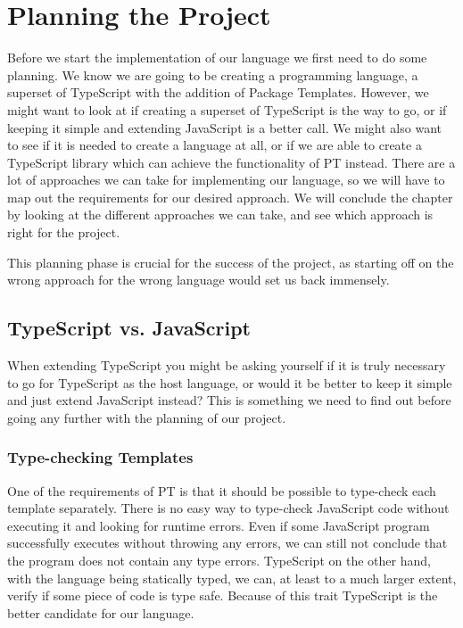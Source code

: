 
\chapter{Planning the Project}\label{ch:planning-the-project}

Before we start the implementation of our language we first need to do some planning.
We know we are going to be creating a programming language, a superset of TypeScript with the addition of Package Templates.
However, we might want to look at if creating a superset of TypeScript is the way to go, or if keeping it simple and extending JavaScript is a better call.
We might also want to see if it is needed to create a language at all, or if we are able to create a TypeScript library which can achieve the functionality of PT instead.
There are a lot of approaches we can take for implementing our language, so we will have to map out the requirements for our desired approach.
We will conclude the chapter by looking at the different approaches we can take, and see which approach is right for the project.

This planning phase is crucial for the success of the project, as starting off on the wrong approach for the wrong language would set us back immensely.

\section{TypeScript vs. JavaScript}\label{sec:typescript-vs-javascript}

When extending TypeScript you might be asking yourself if it is truly necessary to go for TypeScript as the host language, or would it be better to keep it simple and just extend JavaScript instead?
This is something we need to find out before going any further with the planning of our project.

\subsection{Type-checking Templates}\label{subsec:why-typescript-verifying-templates}

One of the requirements of PT is that it should be possible to type-check each template separately.
There is no easy way to type-check JavaScript code without executing it and looking for runtime errors.
Even if some JavaScript program successfully executes without throwing any errors, we can still not conclude that the program does not contain any type errors.
TypeScript on the other hand, with the language being statically typed, we can, at least to a much larger extent, verify if some piece of code is type safe.
Because of this trait TypeScript is the better candidate for our language.


